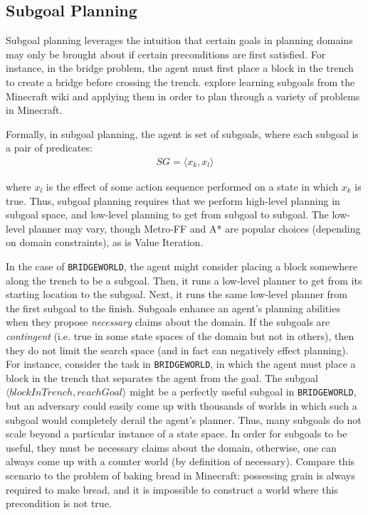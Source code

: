 \documentclass[]{article}
\begin{document}



\subsection{Subgoal Planning}
\label{sec:subgoals}

Subgoal planning leverages the intuition that certain goals in
planning domains may only be brought about if certain preconditions
are first satisfied. For instance, in the bridge problem, the agent must
first place a block in the trench to create a bridge before crossing
the trench.  \citet{branavan12a} explore learning subgoals from the
Minecraft wiki and applying them in order to plan through a variety of
problems in Minecraft.

Formally, in subgoal planning, the agent is set of subgoals, where each subgoal is a pair of predicates:
\begin{align}
SG = \langle x_k, x_l \rangle
\end{align}

where $x_l$ is the effect of some action sequence performed on 
a state in which $x_k$ is true. Thus, subgoal planning requires 
that we perform high-level planning in subgoal space, and low-level 
planning to get from subgoal to subgoal. The low-level planner may vary, though
Metro-FF and A* are popular choices (depending on domain constraints), as is Value Iteration.

In the case of \texttt{BRIDGEWORLD}, the agent might consider placing
a block somewhere along the trench to be a subgoal. Then, it runs
a low-level planner to get from its starting location to the subgoal.
Next, it runs the same low-level planner from the first subgoal to the finish.
Subgoals enhance an agent's planning abilities when they propose {\it
  necessary} claims about the domain. If the subgoals are {\it
  contingent} (i.e. true in some state spaces of the domain but not in
others), then they do not limit the search space (and in fact can negatively 
effect planning). For instance, consider the task in \texttt{BRIDGEWORLD}, 
in which the agent must place a block in the trench that separates the agent 
from the goal. The subgoal $\langle blockInTrench, reachGoal\rangle$ might be a
perfectly useful subgoal in \texttt{BRIDGEWORLD}, but an adversary
could easily come up with thousands of worlds in which such a subgoal
would completely derail the agent's planner. Thus, many subgoals do
not scale beyond a particular instance of a state space. In order for
subgoals to be useful, they must be necessary claims about the domain,
otherwise, one can always come up with a counter world (by definition
of necessary).  Compare this scenario to the problem of baking bread
in Minecraft: possessing grain is always required to make bread, and it
is impossible to construct a world where this precondition is not
true.
\end{document}
